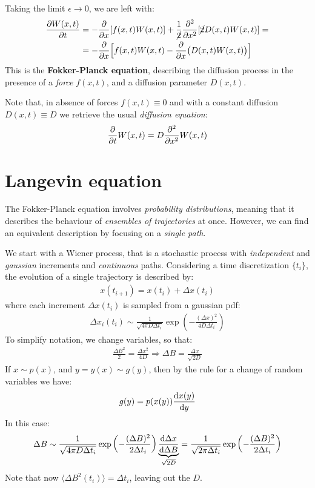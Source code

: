 \documentclass[../template.tex]{subfiles}
\begin{document}
Taking the limit $\epsilon \to 0$, we are left with:
\begin{align*}
    \pdv{W(x,t)}{t} &= -\pdv{x}[f(x,t) W(x,t)] + \frac{1}{\cancel{2}} \pdv[2]{x}[\cancel{2} D(x,t)W(x,t)] =\\
    &= - \pdv{x} \Big[f(x,t) W(x,t) - \pdv{x} \big(D(x,t) W(x,t)\big)\Big]  
\end{align*} 
This is the \textbf{Fokker-Planck equation}, describing the diffusion process in the presence of a \textit{force} $f(x,t)$, and a diffusion parameter $D(x,t)$.

Note that, in absence of forces $f(x,t) \equiv 0$ and with a constant diffusion $D(x,t) \equiv D$ we retrieve the usual \textit{diffusion equation}:
\begin{align*}
    \pdv{t} W(x,t) = D \pdv[2]{x}W(x,t)
\end{align*}     

\section{Langevin equation}
The Fokker-Planck equation involves \textit{probability distributions}, meaning that it describes the behaviour of \textit{ensembles of trajectories} at once. However, we can find an equivalent description by focusing on a \textit{single path}. 

We start with a Wiener process, that is a stochastic process with \textit{independent} and \textit{gaussian} increments and \textit{continuous} paths. Considering a time discretization $\{t_i\}$, the evolution of a single trajectory is described by:
\begin{align}
    x(t_{i+1}) = x(t_i) + \Delta x(t_i) \label{eqn:increment}
\end{align}
where each increment $\Delta x(t_i)$ is sampled from a gaussian pdf:
\begin{align*}
    \Delta x_i(t_i) \sim \frac{1}{\sqrt{4 \pi D \Delta t_i}} \exp\left(-\frac{(\Delta x)^2}{4 D \Delta t_i} \right) 
\end{align*}
To simplify notation, we change variables, so that:
\begin{align*}
    \frac{\Delta B^2}{2} = \frac{\Delta x^2}{4 D} \Rightarrow \Delta B = \frac{\Delta x}{\sqrt{2 D}}    
\end{align*}
If $x \sim p(x)$, and $y = y(x) \sim g(y)$, then by the rule for a change of random variables we have:
\begin{align*}
    g(y) = p(x(y)) \dv{x(y)}{y}(x(y))
\end{align*}
In this case:
\begin{align*}
    \Delta B \sim \frac{1}{\sqrt{4 \pi D \Delta t_i }} \exp\left(-\frac{(\Delta B)^2}{2 \Delta t_i} \right) \underbrace{\dv{\Delta x}{\Delta B}}_{\sqrt{2 D}} = \frac{1}{\sqrt{2 \pi \Delta t_i}} \exp\left(-\frac{(\Delta B)^2}{2 \Delta t_i} \right)  
\end{align*}
Note that now $\langle \Delta B^2(t_i) \rangle = \Delta t_i$, leaving out the $D$.
\end{document}
